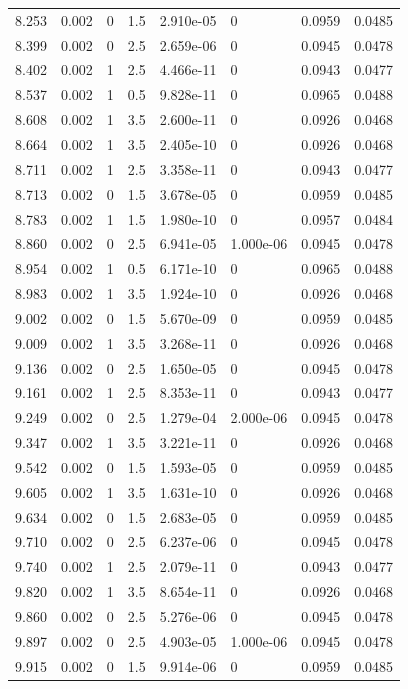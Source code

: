 \documentclass[preview]{standalone}
\begin{document}
{{{{\begin{tabular}{L{1.2cm}C{1.2cm} C{0.3cm}C{0.5cm} C{1.4cm}C{1.4cm} C{1.4cm}C{1.4cm}}
  8.253  &  0.002  & 0     & 1.5 &  2.910e-05  & 0  & 0.0959 &  0.0485   \\ 
  8.399  &  0.002  & 0     & 2.5 &  2.659e-06  & 0  & 0.0945 &  0.0478   \\ 
  8.402  &  0.002  & 1     & 2.5 &  4.466e-11  & 0  & 0.0943 &  0.0477   \\ 
  8.537  &  0.002  & 1     & 0.5 &  9.828e-11  & 0  & 0.0965 &  0.0488   \\ 
  8.608  &  0.002  & 1     & 3.5 &  2.600e-11  & 0  & 0.0926 &  0.0468   \\ 
  8.664  &  0.002  & 1     & 3.5 &  2.405e-10  & 0  & 0.0926 &  0.0468   \\ 
  8.711  &  0.002  & 1     & 2.5 &  3.358e-11  & 0  & 0.0943 &  0.0477   \\ 
  8.713  &  0.002  & 0     & 1.5 &  3.678e-05  & 0  & 0.0959 &  0.0485   \\ 
  8.783  &  0.002  & 1     & 1.5 &  1.980e-10  & 0  & 0.0957 &  0.0484   \\ 
  8.860  &  0.002  & 0     & 2.5 &  6.941e-05  & 1.000e-06  & 0.0945 &  0.0478   \\ 
  8.954  &  0.002  & 1     & 0.5 &  6.171e-10  & 0  & 0.0965 &  0.0488   \\ 
  8.983  &  0.002  & 1     & 3.5 &  1.924e-10  & 0  & 0.0926 &  0.0468   \\ 
  9.002  &  0.002  & 0     & 1.5 &  5.670e-09  & 0  & 0.0959 &  0.0485   \\ 
  9.009  &  0.002  & 1     & 3.5 &  3.268e-11  & 0  & 0.0926 &  0.0468   \\ 
  9.136  &  0.002  & 0     & 2.5 &  1.650e-05  & 0  & 0.0945 &  0.0478   \\ 
  9.161  &  0.002  & 1     & 2.5 &  8.353e-11  & 0  & 0.0943 &  0.0477   \\ 
  9.249  &  0.002  & 0     & 2.5 &  1.279e-04  & 2.000e-06  & 0.0945 &  0.0478   \\ 
  9.347  &  0.002  & 1     & 3.5 &  3.221e-11  & 0  & 0.0926 &  0.0468   \\ 
  9.542  &  0.002  & 0     & 1.5 &  1.593e-05  & 0  & 0.0959 &  0.0485   \\ 
  9.605  &  0.002  & 1     & 3.5 &  1.631e-10  & 0  & 0.0926 &  0.0468   \\ 
  9.634  &  0.002  & 0     & 1.5 &  2.683e-05  & 0  & 0.0959 &  0.0485   \\ 
  9.710  &  0.002  & 0     & 2.5 &  6.237e-06  & 0  & 0.0945 &  0.0478   \\ 
  9.740  &  0.002  & 1     & 2.5 &  2.079e-11  & 0  & 0.0943 &  0.0477   \\ 
  9.820  &  0.002  & 1     & 3.5 &  8.654e-11  & 0  & 0.0926 &  0.0468   \\ 
  9.860  &  0.002  & 0     & 2.5 &  5.276e-06  & 0  & 0.0945 &  0.0478   \\ 
  9.897  &  0.002  & 0     & 2.5 &  4.903e-05  & 1.000e-06  & 0.0945 &  0.0478   \\ 
  9.915  &  0.002  & 0     & 1.5 &  9.914e-06  & 0  & 0.0959 &  0.0485   \\ 
\hline 
\end{tabular} 

}}}}
\end{document}
